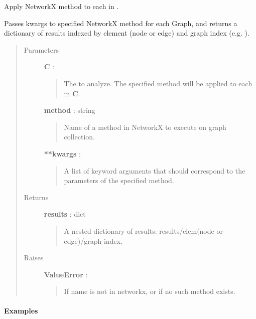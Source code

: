 \documentclass[letterpaper,10pt,english]{sphinxmanual}
\begin{document}
\begin{fulllineitems}
\label{tethne.analyze:tethne.analyze.collection.algorithm}
Apply NetworkX method to each  in {\hyperref[tethne:tethne.data.GraphCollection]{}}.

Passes kwargs to specified NetworkX method for each Graph, and returns
a dictionary of results indexed by element (node or edge) and graph index
(e.g. ).
\begin{quote}\begin{description}
\item[{Parameters }] \leavevmode
\textbf{C} : {\hyperref[tethne:tethne.data.GraphCollection]{}}
\begin{quote}

The {\hyperref[tethne:tethne.data.GraphCollection]{}} to analyze. The specified method will be
applied to each  in \textbf{C}.
\end{quote}

\textbf{method} : string
\begin{quote}

Name of a method in NetworkX to execute on graph collection.
\end{quote}

\textbf{**kwargs} :
\begin{quote}

A list of keyword arguments that should correspond to the parameters
of the specified method.
\end{quote}

\item[{Returns }] \leavevmode
\textbf{results} : dict
\begin{quote}

A nested dictionary of results: results/elem(node or edge)/graph
index.
\end{quote}

\item[{Raises }] \leavevmode
\textbf{ValueError} :
\begin{quote}

If name is not in networkx, or if no such method exists.
\end{quote}

\end{description}\end{quote}
\paragraph{Examples}


\end{fulllineitems}
\end{document}
